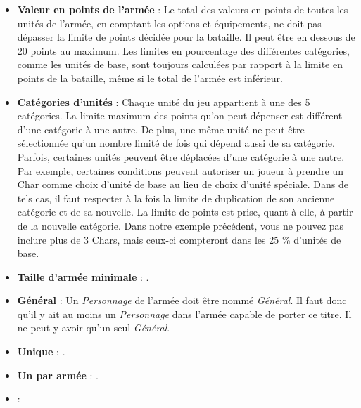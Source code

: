 \begin{itemize}[label={-}]
\item \textbf{Valeur en points de l'armée} : Le total des valeurs en points de toutes les unités de l'armée, en comptant les options et équipements, ne doit pas dépasser la limite de points décidée pour la bataille. Il peut être en dessous de 20 points au maximum. Les limites en pourcentage des différentes catégories, comme les unités de base, sont toujours calculées par rapport à la limite en points de la bataille, même si le total de l'armée est inférieur.
\item \textbf{Catégories d'unités} : Chaque unité du jeu appartient à une des 5 catégories. La limite maximum des points qu'on peut dépenser est différent d'une catégorie à une autre. De plus, une même unité ne peut être sélectionnée qu'un nombre limité de fois qui dépend aussi de sa catégorie. Parfois, certaines unités peuvent être déplacées d'une catégorie à une autre. Par exemple, certaines conditions peuvent autoriser un joueur à prendre un Char comme choix d’unité de base au lieu de choix d’unité spéciale. Dans de tels cas, il faut respecter à la fois la limite de duplication de son ancienne catégorie et de sa nouvelle. La limite de points est prise, quant à elle, à partir de la nouvelle catégorie. Dans notre exemple précédent, vous ne pouvez pas inclure plus de 3 Chars, mais ceux-ci compteront dans les 25 \% d'unités de base.
\item \textbf{Taille d'armée minimale} : .
\item \textbf{Général} : Un \emph{Personnage} de l'armée doit être nommé \emph{Général}. Il faut donc qu'il y ait au moins un \emph{Personnage} dans l'armée capable de porter ce titre. Il ne peut y avoir qu'un seul \emph{Général}.
\item \textbf{Unique} : .
\item \textbf{Un par armée} : .
\item \textbf{} : 
\end{itemize}

